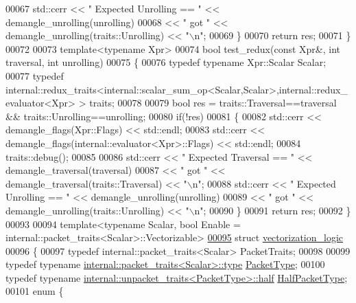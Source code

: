 \begin{DoxyCode}
00067     std::cerr << \textcolor{stringliteral}{" Expected Unrolling == "} << demangle\_unrolling(unrolling)
00068               << \textcolor{stringliteral}{" got "} << demangle\_unrolling(traits::Unrolling) << \textcolor{stringliteral}{"\(\backslash\)n"};
00069   \}
00070   \textcolor{keywordflow}{return} res;
00071 \}
00072 
00073 \textcolor{keyword}{template}<\textcolor{keyword}{typename} Xpr>
00074 \textcolor{keywordtype}{bool} test\_redux(\textcolor{keyword}{const} Xpr&, \textcolor{keywordtype}{int} traversal, \textcolor{keywordtype}{int} unrolling)
00075 \{
00076   \textcolor{keyword}{typedef} \textcolor{keyword}{typename} Xpr::Scalar Scalar;
00077   \textcolor{keyword}{typedef} internal::redux\_traits<internal::scalar\_sum\_op<Scalar,Scalar>,internal::redux\_evaluator<Xpr> > 
      traits;
00078   
00079   \textcolor{keywordtype}{bool} res = traits::Traversal==traversal && traits::Unrolling==unrolling;
00080   \textcolor{keywordflow}{if}(!res)
00081   \{
00082     std::cerr << demangle\_flags(Xpr::Flags) << std::endl;
00083     std::cerr << demangle\_flags(internal::evaluator<Xpr>::Flags) << std::endl;
00084     traits::debug();
00085     
00086     std::cerr << \textcolor{stringliteral}{" Expected Traversal == "} << demangle\_traversal(traversal)
00087               << \textcolor{stringliteral}{" got "} << demangle\_traversal(traits::Traversal) << \textcolor{stringliteral}{"\(\backslash\)n"};
00088     std::cerr << \textcolor{stringliteral}{" Expected Unrolling == "} << demangle\_unrolling(unrolling)
00089               << \textcolor{stringliteral}{" got "} << demangle\_unrolling(traits::Unrolling) << \textcolor{stringliteral}{"\(\backslash\)n"};
00090   \}
00091   \textcolor{keywordflow}{return} res;
00092 \}
00093 
00094 template<typename Scalar, bool Enable = internal::packet\_traits<Scalar>::Vectorizable>
\hyperlink{structvectorization__logic}{00095} \textcolor{keyword}{struct }\hyperlink{structvectorization__logic}{vectorization\_logic}
00096 \{
00097   \textcolor{keyword}{typedef} internal::packet\_traits<Scalar> PacketTraits;
00098   
00099   \textcolor{keyword}{typedef} \textcolor{keyword}{typename} \hyperlink{group___sparse_core___module}{internal::packet\_traits<Scalar>::type} 
      \hyperlink{group___sparse_core___module}{PacketType};
00100   \textcolor{keyword}{typedef} \textcolor{keyword}{typename} \hyperlink{union_eigen_1_1internal_1_1_packet}{internal::unpacket\_traits<PacketType>::half} 
      \hyperlink{union_eigen_1_1internal_1_1_packet}{HalfPacketType};
00101   \textcolor{keyword}{enum} \{

\end{DoxyCode}
